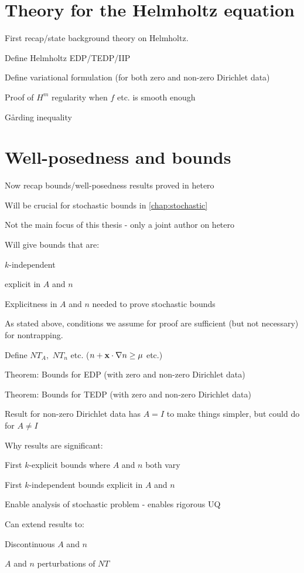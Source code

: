\section{Theory for the Helmholtz equation}
First recap/state background theory on Helmholtz.
\bit
\item Define Helmholtz EDP/TEDP/IIP
\item Define variational formulation (for both zero and non-zero Dirichlet data)
\item Proof of $H^m$ regularity when $f$ etc. is smooth enough
\item G\r{a}rding inequality
\eit

\section{Well-posedness and bounds}
\bit
\item Now recap bounds/well-posedness results proved in hetero
\item Will be crucial for stochastic bounds in \cref{chap:stochastic}
\item Not the main focus of this thesis - only a joint author on hetero
\item Will give bounds that are:
\bit
\item $k$-independent
\item explicit in $A$ and $n$
\eit
\item Explicitness in $A$ and $n$ needed to prove stochastic bounds
\item As stated above, conditions we assume for proof are sufficient (but not necessary) for nontrapping.
\eit

\bit
\item Define $NT_A,$ $NT_n$ etc. ($n + \mathbf{x} \cdot \nabla n \geq \mu$ etc.)
\item Theorem: Bounds for EDP (with zero and non-zero Dirichlet data)
\item Theorem: Bounds for TEDP (with zero and non-zero Dirichlet data)
\item Result for non-zero Dirichlet data has $A=I$ to make things simpler, but could do for $A \neq I$
\item Why results are significant:
\bit
\item First $k$-explicit bounds where $A$ and $n$ both vary
\item First $k$-independent bounds explicit in $A$ and $n$
\item Enable analysis of stochastic problem - enables rigorous UQ
\eit
\item Can extend results to:
\bit
\item Discontinuous $A$ and $n$
\item $A$ and $n$ perturbations of $NT$
\eit
\eit

